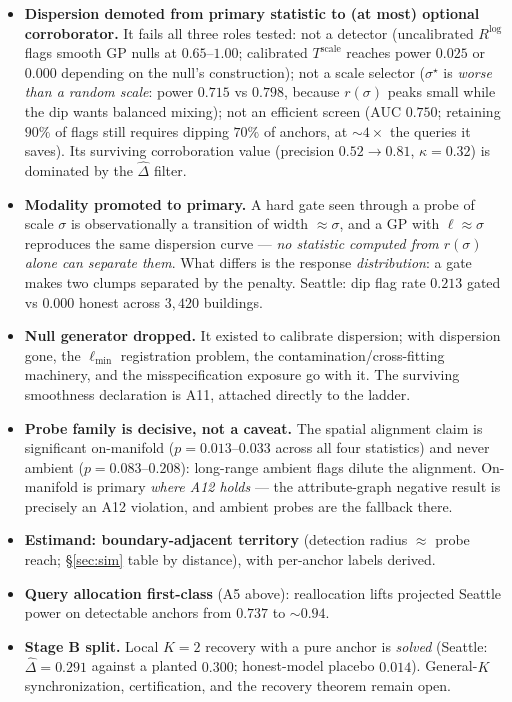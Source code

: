 \documentclass[11pt]{article}
\begin{document}
\begin{itemize}[leftmargin=1.8em,itemsep=2pt]
  \item \textbf{Dispersion demoted from primary statistic to (at most) optional
  corroborator.} It fails all three roles tested: not a detector (uncalibrated $R^{\log}$
  flags smooth GP nulls at $0.65$--$1.00$; calibrated $T^{\mathrm{scale}}$ reaches power
  $0.025$ or $0.000$ depending on the null's construction); not a scale selector
  ($\sigma^\star$ is \emph{worse than a random scale}: power $0.715$ vs $0.798$, because
  $r(\sigma)$ peaks small while the dip wants balanced mixing); not an efficient screen (AUC
  $0.750$; retaining $90\%$ of flags still requires dipping $70\%$ of anchors, at
  $\sim 4\times$ the queries it saves). Its surviving corroboration value (precision
  $0.52\to 0.81$, $\kappa=0.32$) is dominated by the $\widehat\Delta$ filter.
  \item \textbf{Modality promoted to primary.} A hard gate seen through a probe of scale
  $\sigma$ is observationally a transition of width $\approx\sigma$, and a GP with
  $\ell\approx\sigma$ reproduces the same dispersion curve --- \emph{no statistic computed
  from $r(\sigma)$ alone can separate them}. What differs is the response
  \emph{distribution}: a gate makes two clumps separated by the penalty. Seattle: dip flag
  rate $0.213$ gated vs $0.000$ honest across $3{,}420$ buildings.
  \item \textbf{Null generator dropped.} It existed to calibrate dispersion; with dispersion
  gone, the $\ell_{\min}$ registration problem, the contamination/cross-fitting machinery,
  and the misspecification exposure go with it. The surviving smoothness declaration is A11,
  attached directly to the ladder.
  \item \textbf{Probe family is decisive, not a caveat.} The spatial alignment claim is
  significant on-manifold ($p=0.013$--$0.033$ across all four statistics) and never ambient
  ($p=0.083$--$0.208$): long-range ambient flags dilute the alignment. On-manifold is
  primary \emph{where A12 holds} --- the attribute-graph negative result is precisely an A12
  violation, and ambient probes are the fallback there.
  \item \textbf{Estimand: boundary-adjacent territory} (detection radius $\approx$ probe
  reach; \S\ref{sec:sim} table by distance), with per-anchor labels derived.
  \item \textbf{Query allocation first-class} (A5 above): reallocation lifts projected
  Seattle power on detectable anchors from $0.737$ to ${\sim}0.94$.
  \item \textbf{Stage B split.} Local $K{=}2$ recovery with a pure anchor is \emph{solved}
  (Seattle: $\widehat\Delta=0.291$ against a planted $0.300$; honest-model placebo $0.014$).
  General-$K$ synchronization, certification, and the recovery theorem remain open.
\end{itemize}
\end{document}
